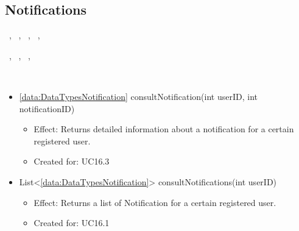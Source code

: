   \subsection{Notifications}\label{int:OnlineServiceOnlineServiceRegisteredUserFacadeNotifications}
    \begin{description}
      \item[Provided by:] \iconcomponent{}~, \iconcomponent{}~, \iconcomponent{}~, \iconcomponent{}~, \iconcomponent{}~
      \item[Required by:] \iconcomponent{}~, \iconcomponent{}~, \iconcomponent{}~, \iconcomponent{}~
      \item[Operations:] ~
    \begin{itemize}[noitemsep,nolistsep,leftmargin=-.25cm]
      \item \textsf{\ref{data:DataTypesNotification} consultNotification(int userID, int notificationID)}
        \begin{itemize}[noitemsep,nolistsep]
           \item Effect: Returns detailed information about a notification for a certain registered user.
\item Created for: UC16.3
        \end{itemize}
      \item \textsf{List\textless{}\ref{data:DataTypesNotification}\textgreater{} consultNotifications(int userID)}
        \begin{itemize}[noitemsep,nolistsep]
           \item Effect: Returns a list of Notification for a certain registered user.
\item Created for: UC16.1
        \end{itemize}
    \end{itemize}
    \end{description}


